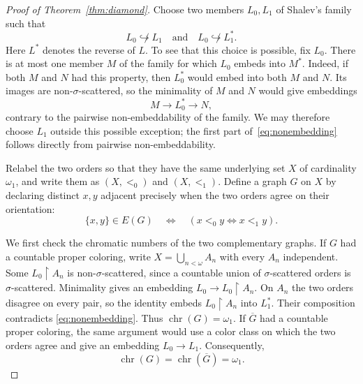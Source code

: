 \documentclass{amsart}
\numberwithin{equation}{section}
\theoremstyle{definition}
\theoremstyle{remark}
\newcommand{\chr}{\operatorname{chr}}
\newcommand{\restr}{\mathbin{\upharpoonright}}
\begin{document}
\begin{proof}[Proof of Theorem~\ref{thm:diamond}]
Choose two members $L_0,L_1$ of Shalev's family such that
\begin{equation}\label{eq:nonembedding}
 L_0\not\hookrightarrow L_1
 \quad\text{and}\quad
 L_0\not\hookrightarrow L_1^*.
\end{equation}
Here $L^*$ denotes the reverse of $L$.  To see that this choice is
possible, fix $L_0$.  There is at most one member $M$ of the
family for which $L_0$ embeds into $M^*$.  Indeed, if both $M$ and
$N$ had this property, then $L_0^*$ would embed into both $M$ and
$N$.  Its images are non-$\sigma$-scattered, so the minimality of
$M$ and $N$ would give embeddings
\begin{displaymath}
 M\longrightarrow L_0^*\longrightarrow N,
\end{displaymath}
contrary to the pairwise non-embeddability of the family.  We may
therefore choose $L_1$ outside this possible exception; the first part
of~\eqref{eq:nonembedding} follows directly from pairwise
non-embeddability.

Relabel the two orders so that they have the same underlying set $X$
of cardinality $\omega_1$, and write them as $(X,<_{0})$ and
$(X,<_{1})$.  Define a graph $G$ on $X$ by declaring distinct $x,y$
adjacent precisely when the two orders agree on their orientation:
\begin{equation}\label{eq:edge-definition}
 \{x,y\}\in E(G)
 \quad\Longleftrightarrow\quad
 (x<_{0}y\Longleftrightarrow x<_{1}y).
\end{equation}

We first check the chromatic numbers of the two complementary graphs.
If $G$ had a countable proper coloring, write $X=\bigcup_{n<\omega}A_n$
with every $A_n$ independent.  Some $L_0\restr A_n$ is
non-$\sigma$-scattered, since a countable union of
$\sigma$-scattered orders is $\sigma$-scattered.  Minimality gives
an embedding $L_0\longrightarrow L_0\restr A_n$.  On $A_n$ the two
orders disagree on every pair, so the identity embeds
$L_0\restr A_n$ into $L_1^*$.  Their composition contradicts
\eqref{eq:nonembedding}.
Thus $\chr(G)=\omega_1$.  If $\overline G$ had a countable proper
coloring, the same argument would use a color class on which the two
orders agree and give an embedding $L_0\longrightarrow L_1$.
Consequently,
\begin{equation}\label{eq:factor-chromatic-numbers}
 \chr(G)=\chr(\overline G)=\omega_1.
\end{equation}


\end{proof}
\end{document}

